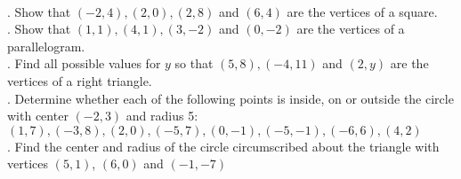 \documentclass[10pt,letterpaper]{article}
\begin{document}
\\
. Show that $(-2,4), (2,0), (2,8)$ and $(6,4)$ are the vertices of a square.\\
. Show that $(1,1), (4,1), (3,-2)$ and $(0,-2)$ are the vertices of a parallelogram.\\
. Find all possible values for $y$ so that $(5,8), (-4,11)$ and $(2,y)$ are the vertices of a right triangle.\\
. Determine whether each of the following points is inside, on or outside the circle with center $(-2, 3)$ and radius 5: $(1,7), (-3,8), (2,0), (-5,7), (0,-1), (-5,-1), (-6,6), (4,2)$\\
. Find the center and radius of the circle circumscribed about the triangle with vertices $(5,1)$, $(6,0)$ and $(-1, -7)$\\
%


\end{document}
